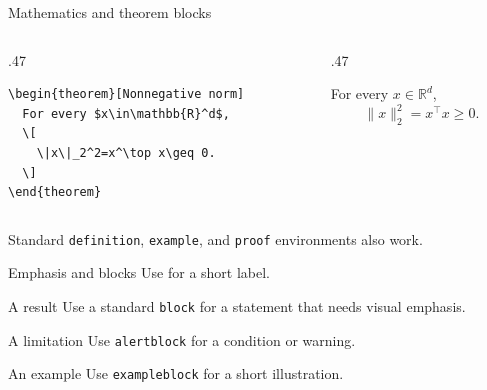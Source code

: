 \documentclass[aspectratio=169,11pt,t,compress]{beamer}
\begin{document}
\begin{frame}[fragile]{Mathematics and theorem blocks}
  \begin{columns}[T,onlytextwidth]
    \begin{column}{.47\textwidth}
      \begin{lstlisting}[basicstyle=\ttfamily\footnotesize]
\begin{theorem}[Nonnegative norm]
  For every $x\in\mathbb{R}^d$,
  \[
    \|x\|_2^2=x^\top x\geq 0.
  \]
\end{theorem}
      \end{lstlisting}
    \end{column}
    \begin{column}{.47\textwidth}
      \begin{theorem}
        For every $x\in\mathbb{R}^d$,
        \[
          \|x\|_2^2=x^\top x\geq 0.
        \]
      \end{theorem}
    \end{column}
  \end{columns}

  \vspace{.30cm}
  Standard \texttt{definition}, \texttt{example}, and \texttt{proof} environments also work.
\end{frame}

\begin{frame}{Emphasis and blocks}
  \quad Use \texttt{\string\loomkeyterm} for a short label.
  \begin{block}{A result}
    Use a standard \texttt{block} for a statement that needs visual emphasis.
  \end{block}
  \begin{alertblock}{A limitation}
    Use \texttt{alertblock} for a condition or warning.
  \end{alertblock}
  \begin{exampleblock}{An example}
    Use \texttt{exampleblock} for a short illustration.
  \end{exampleblock}
\end{frame}
\end{document}
